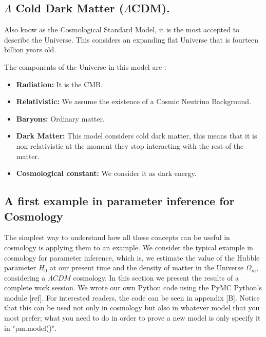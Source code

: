 \documentclass[onecolumn,           %
               showpacs,            %
               preprintnumbers,     %
               aps,                 %
               letterpaper,             %
               superscriptaddress,      %
               nofootinbib,         %
               tightenlines,        %
               floats,floatfix      %
               ,usenatbib,
               ]{revtex4-1}
\begin{document}
\subsection{$\Lambda$ Cold Dark Matter ($\Lambda$CDM).}
Also know as the Cosmological Standard Model, it is the most accepted to describe the Universe. This considers an expanding flat Universe that is fourteen billion years old. 

The components of the Universe in this model are \cite{liddle}:
\begin{itemize}
	\item \textbf{Radiation:} It is the CMB.
	\item \textbf{Relativistic:} We assume the existence of a Cosmic Neutrino Background.
	\item \textbf{Baryons:} Ordinary matter. 	
	\item \textbf{Dark Matter:} This model considers cold dark matter, this means that it is non-relativistic at the moment they stop interacting with the rest of the matter.	
	\item \textbf{Cosmological constant:} We consider it as dark energy.
\end{itemize}



\subsection{A first example in parameter inference for Cosmology}

The simplest way to understand how all these concepts can be useful in cosmology is applying them to an example. We consider the typical example in cosmology for parameter inference, which is, we estimate the value of the Hubble parameter $H_0$ at our present time and the density of matter in the Universe $\Omega_m$, considering a $\Lambda CDM$ cosmology. In this section we present the results of a complete work session. We wrote our own Python code using the PyMC Python's module [ref]. For interested readers, the code can be seen in appendix [B]. Notice that this can be used not only in cosmology but also in whatever model that you most prefer; what you need to do in order to prove a new model is only specify it in "pm.model()". 
\end{document}
